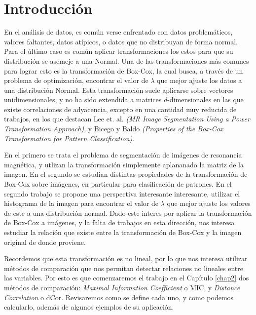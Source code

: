 \chapter{Introducci\'on}\label{chap1}

En el an\'alisis de datos, es com\'un verse enfrentado con datos problem\'aticos, valores faltantes, datos at\'ipicos, o datos que no distribuyan de forma normal. Para el \'ultimo caso es com\'un aplicar transformaciones los estos para que su distribuci\'on se asemeje a una Normal. Una de las transformaciones m\'as comunes para lograr esto es la transformaci\'on de Box-Cox, la cual busca, a trav\'es de un problema de optimizaci\'on, encontrar el valor de $\lambda$ que mejor ajuste los datos a una distribuci\'on Normal. Esta transformaci\'on suele aplicarse sobre  vectores unidimensionales, y no ha sido extendida a matrices $d$-dimensionales en las que existe correlaciones de adyacencia, excepto en una cantidad muy reducida de trabajos, en los que destacan Lee et. al. \textit{(MR Image Segmentation Using a Power Transformation Approach)}\cite{lee2009mr}, y Bicego y Baldo \textit{(Properties of the Box-Cox Transformation for Pattern Classification)}\cite{bicego2016}. 

En el primero se trata el problema de segmentaci\'on de im\'agenes de resonancia magn\'etica, y utlizan la transformaci\'on simplemente aplananado la matriz de la imagen. En el segundo se estudian distintas propiedades de la transformaci\'on de Box-Cox sobre im\'agenes, en particular para clasificaci\'on de patrones. En el segundo trabajo se propone una perspectiva interesante interesante, utilizar el histograma de la imagen para encontrar el valor de $\lambda$ que mejor ajuste los valores de este a una distribuci\'on normal. Dado este interes por aplicar la transformaci\'on de Box-Cox a im\'agenes, y la falta de trabajos en esta direcci\'on, nos interesa estudiar la relaci\'on que existe entre la transformaci\'on de Box-Cox y la imagen original de donde proviene.

Recordemos que esta transformaci\'on es no lineal, por lo que nos interesa utilizar m\'etodos de comparaci\'on que nos permitan detectar relaciones no lineales entre las variables. Por esto es que comenzaremos el trabajo en el Cap\'itulo \ref{chap2} dos m\'etodos de comparaci\'on: \textit{Maximal Information Coefficient} o MIC, y \textit{Distance Correlation} o dCor. Revisaremos como se define cada uno, y como podemos calcularlo, adem\'as de algunos ejemplos de su aplicaci\'on.

